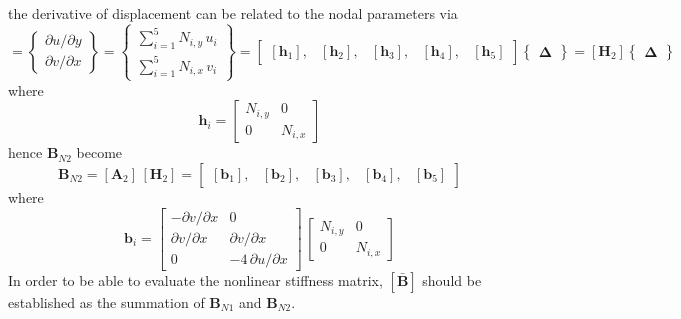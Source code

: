 the derivative of displacement can be related to the nodal parameters via
\begin{equation}
[\boldsymbol{\theta}_2] =  \begin{Bmatrix}
\partial u / \partial y\\
\partial v / \partial x
\end{Bmatrix}
= \begin{Bmatrix}
\sum\nolimits_{i=1}^5 N_{i,y} \, u_i\\
\sum\nolimits_{i=1}^5 N_{i,x} \, v_i
\end{Bmatrix} 
= \begin{bmatrix}
[\mathbf{h}_1], & [\mathbf{h}_2], & [\mathbf{h}_3], & [\mathbf{h}_4], & [\mathbf{h}_5] 
\end{bmatrix}  \begin{Bmatrix} \boldsymbol{\Delta} \end{Bmatrix}  
= [\mathbf{H}_2] \begin{Bmatrix} \boldsymbol{\Delta} \end{Bmatrix} 
\end{equation}
where 
\begin{equation}
\mathbf{h}_i = \begin{bmatrix}
N_{i,y} &  0  \\
0 & N_{i,x}  \end{bmatrix} 
\end{equation}
hence $\mathbf{B}_{N2}$ become
\begin{equation}
\mathbf{B}_{N2} = [\mathbf{A}_2] \, [\mathbf{H}_2] = \begin{bmatrix}
[\mathbf{b}_1], & [\mathbf{b}_2], & [\mathbf{b}_3], & [\mathbf{b}_4], & [\mathbf{b}_5] 
\end{bmatrix} 
\end{equation}
where
\begin{equation}
\mathbf{b}_i = \begin{bmatrix}
- \partial v / \partial x &  0 \\
\partial v / \partial x &  \partial v / \partial x \\
0 & -4 \, \partial u / \partial x  \end{bmatrix} \, \begin{bmatrix}
N_{i,y} &  0  \\
0 & N_{i,x}  \end{bmatrix} 
\end{equation}
In order to be able to evaluate the nonlinear stiffness matrix, $[\mathbf{\bar{B}}]$ should be established as the summation of $ \mathbf{B}_{N1}$ and $\mathbf{B}_{N2}$.
